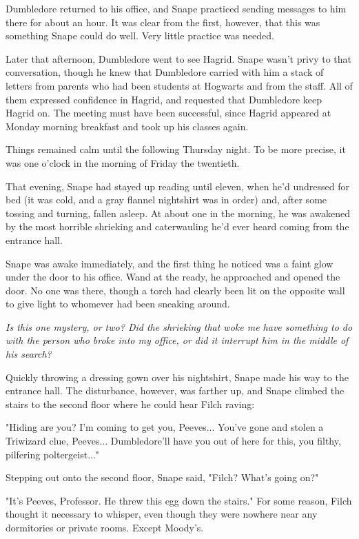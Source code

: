 Dumbledore returned to his office, and Snape practiced sending messages to him there for about an hour. It was clear from the first, however, that this was something Snape could do well. Very little practice was needed.

Later that afternoon, Dumbledore went to see Hagrid. Snape wasn't privy to that conversation, though he knew that Dumbledore carried with him a stack of letters from parents who had been students at Hogwarts and from the staff. All of them expressed confidence in Hagrid, and requested that Dumbledore keep Hagrid on. The meeting must have been successful, since Hagrid appeared at Monday morning breakfast and took up his classes again.

Things remained calm until the following Thursday night. To be more precise, it was one o'clock in the morning of Friday the twentieth.

That evening, Snape had stayed up reading until eleven, when he'd undressed for bed (it was cold, and a gray flannel nightshirt was in order) and, after some tossing and turning, fallen asleep. At about one in the morning, he was awakened by the most horrible shrieking and caterwauling he'd ever heard coming from the entrance hall.

Snape was awake immediately, and the first thing he noticed was a faint glow under the door to his office. Wand at the ready, he approached and opened the door. No one was there, though a torch had clearly been lit on the opposite wall to give light to whomever had been sneaking around.

\emph{Is this one mystery, or two? Did the shrieking that woke me have something to do with the person who broke into my office, or did it interrupt him in the middle of his search?}

Quickly throwing a dressing gown over his nightshirt, Snape made his way to the entrance hall. The disturbance, however, was farther up, and Snape climbed the stairs to the second floor where he could hear Filch raving:

"Hiding are you? I'm coming to get you, Peeves... You've gone and stolen a Triwizard clue, Peeves... Dumbledore'll have you out of here for this, you filthy, pilfering poltergeist..."

Stepping out onto the second floor, Snape said, "Filch? What's going on?"

"It's Peeves, Professor. He threw this egg down the stairs." For some reason, Filch thought it necessary to whisper, even though they were nowhere near any dormitories or private rooms. Except Moody's.

